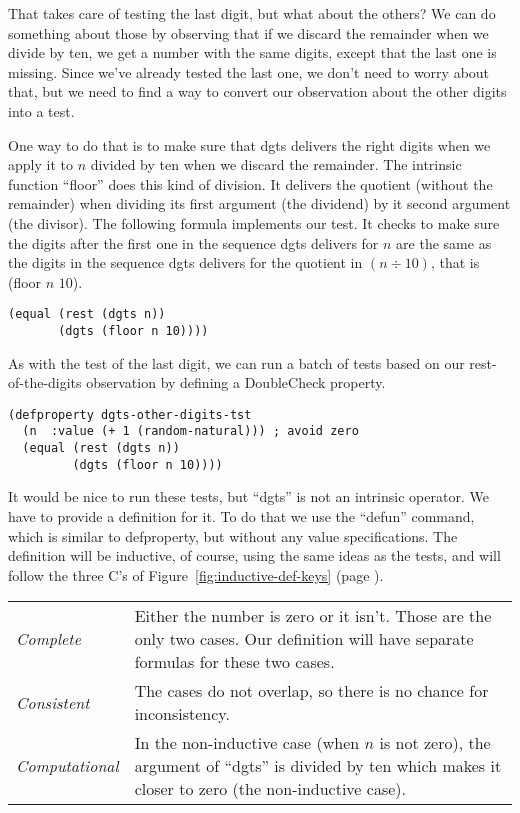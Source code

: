 That takes care of testing the last digit, but what about the others?
We can do something about those by observing that if we discard the
remainder when we divide by ten, we get a number with the same digits,
except that the last one is missing.
Since we've already tested the last one, we don't need to worry about that,
but we need to find a way to convert our observation about the other digits into a test.

One way to do that is to make sure that dgts delivers the right digits when
we apply it to $n$ divided by ten when we discard the remainder.
The intrinsic function ``floor'' does this kind of division.
It delivers the quotient (without the remainder) when dividing its first argument (the dividend)
by it second argument (the divisor). The following formula implements our test.
It checks to make sure the digits after the first one in the sequence dgts delivers for $n$
are the same as the digits in the sequence dgts delivers for the quotient in $(n \div 10)$,
that is (floor $n$ $10$).
\begin{lstlisting}
(equal (rest (dgts n))
       (dgts (floor n 10))))
\end{lstlisting}

As with the test of the last digit, we can run a batch of tests based on our rest-of-the-digits
observation by defining a DoubleCheck property.

\begin{lstlisting}
(defproperty dgts-other-digits-tst
  (n  :value (+ 1 (random-natural))) ; avoid zero
  (equal (rest (dgts n))
         (dgts (floor n 10))))
\end{lstlisting}

It would be nice to run these tests, but ``dgts'' is not an intrinsic operator.
We have to provide a definition for it.
To do that we use the ``defun'' command, which is similar to defproperty,
but without any value specifications. The definition will be inductive,
of course, using the same ideas as the tests,
and will follow the three C's of Figure~\ref{fig:inductive-def-keys}
(page \pageref{fig:inductive-def-keys}).
\begin{center}
\begin{tabular}{lp{3.5in}}
\emph{Complete} & Either the number is zero or it isn't. Those are the only two cases.
Our definition will have separate formulas for these two cases. \\
\emph{Consistent} &  The cases do not overlap, so there is no chance for inconsistency.\\
\emph{Computational} & In the non-inductive case (when $n$ is not zero), the argument of
``dgts'' is divided by ten which makes it closer to zero (the non-inductive case).
\end{tabular}
\end{center}

